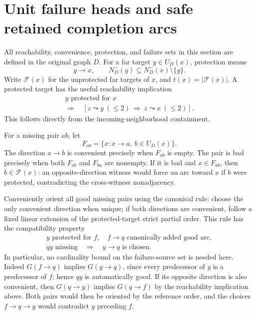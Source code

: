 \section{Unit failure heads and safe retained completion arcs}
\label{sec:unit-failure-sources}

All reachability, convenience, protection, and failure sets in this
section are defined in the original graph $D$.
For a far target $y\in U_D(x)$, protection means
\[
 y\to x,\qquad N_D^-(y)\subseteq N_D^-(x)\setminus\{y\}.
\]
Write $\mathcal F(x)$ for the unprotected far targets of $x$, and
$t(x)=|\mathcal F(x)|$.
A protected target has the useful reachability implication
\[
 \begin{gathered}
 y\text{ protected for }x\\
 \Longrightarrow\quad
 [z\leadsto y\ (\le2)\ \Longrightarrow\ z\leadsto x\ (\le2)].
 \end{gathered}
\]
This follows directly from the incoming-neighborhood containment.

For a missing pair $ab$, let
\[
 F_{ab}=\{x:x\to a,\ b\in U_D(x)\}.
\]
The direction $a\to b$ is convenient precisely when $F_{ab}$ is empty.
The pair is bad precisely when both $F_{ab}$ and $F_{ba}$ are nonempty.
If it is bad and $x\in F_{ab}$, then $b\in\mathcal F(x)$:
an opposite-direction witness would force an arc toward $x$ if $b$
were protected, contradicting the cross-witness nonadjacency.

Conveniently orient all good missing pairs using the canonical rule:
choose the only convenient direction when unique; if both directions
are convenient, follow a fixed linear extension of the protected-target
strict partial order.  This rule has the compatibility property
\[
 \begin{gathered}
 y\text{ protected for }f,\quad f\to q\text{ canonically added good arc},\\
 qy\text{ missing}\quad\Longrightarrow\quad y\to q\text{ is chosen}.
 \end{gathered}
 \tag{UF1}\label{eq:unit-good-compatibility}
\]
In particular, no cardinality bound on the failure-source set is
needed here.  Indeed $G(f\to q)$ implies $G(y\to q)$, since every
predecessor of $y$ is a predecessor of $f$; hence $qy$ is automatically
good.  If its opposite direction is also convenient, then
$G(q\to y)$ implies $G(q\to f)$ by the reachability implication above.
Both pairs would then be oriented by the reference order, and the
choices $f\to q\to y$ would contradict $y$ preceding $f$.

